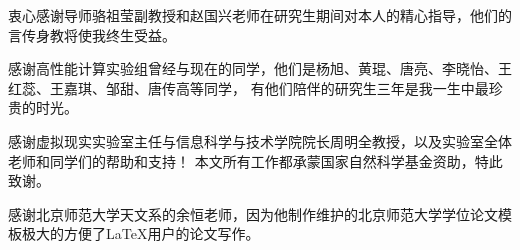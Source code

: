 
\begin{ack}
衷心感谢导师骆祖莹副教授和赵国兴老师在研究生期间对本人的精心指导，他们的言传身教将使我终生受益。

感谢高性能计算实验组曾经与现在的同学，他们是杨旭、黄琨、唐亮、李晓怡、王红蕊、王嘉琪、邹甜、唐传高等同学， 有他们陪伴的研究生三年是我一生中最珍贵的时光。

感谢虚拟现实实验室主任与信息科学与技术学院院长周明全教授，以及实验室全体老师和同学们的帮助和支持！ 本文所有工作都承蒙国家自然科学基金资助，特此致谢。

感谢北京师范大学天文系的余恒老师，因为他制作维护的北京师范大学学位论文模板极大的方便了\LaTeX{}用户的论文写作。

\end{ack}
